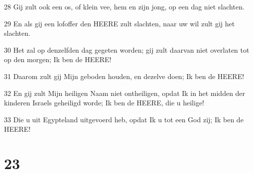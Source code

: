 \par 28 Gij zult ook een os, of klein vee, hem en zijn jong, op een dag niet slachten.
\par 29 En als gij een lofoffer den HEERE zult slachten, naar uw wil zult gij het slachten.
\par 30 Het zal op denzelfden dag gegeten worden; gij zult daarvan niet overlaten tot op den morgen; Ik ben de HEERE!
\par 31 Daarom zult gij Mijn geboden houden, en dezelve doen; Ik ben de HEERE!
\par 32 En gij zult Mijn heiligen Naam niet ontheiligen, opdat Ik in het midden der kinderen Israels geheiligd worde; Ik ben de HEERE, die u heilige!
\par 33 Die u uit Egypteland uitgevoerd heb, opdat Ik u tot een God zij; Ik ben de HEERE!

\chapter{23}

